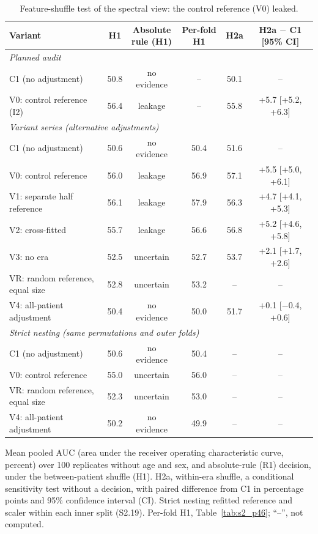 \documentclass[final,1p,times]{elsarticle}
\newcommand{\tabref}[1]{Table~\ref{#1}}
\begin{document}
\begin{table}[!htb]
\caption{Feature-shuffle test of the spectral view: the control reference (V0) leaked.}\label{tab:kebocoran_badan}
\centering\scriptsize
\setlength{\tabcolsep}{2.5pt}
\begin{tabular}{p{}ccccc}
\toprule
Variant & H1 & \shortstack{Absolute\\rule (H1)} & Per-fold H1 & H2a & \shortstack{H2a $-$ C1\\{[95\% CI]}} \\
\midrule
\multicolumn{6}{l}{\textit{Planned audit}} \\
C1 (no adjustment) & 50.8 & no evidence & -- & 50.1 & -- \\
V0: control reference (I2) & 56.4 & leakage & -- & 55.8 & +5.7 [+5.2, +6.3] \\
\midrule
\multicolumn{6}{l}{\textit{Variant series (alternative adjustments)}} \\
C1 (no adjustment) & 50.6 & no evidence & 50.4 & 51.6 & -- \\
V0: control reference & 56.0 & leakage & 56.9 & 57.1 & +5.5 [+5.0, +6.1] \\
V1: separate half reference & 56.1 & leakage & 57.9 & 56.3 & +4.7 [+4.1, +5.3] \\
V2: cross-fitted & 55.7 & leakage & 56.6 & 56.8 & +5.2 [+4.6, +5.8] \\
V3: no era & 52.5 & uncertain & 52.7 & 53.7 & +2.1 [+1.7, +2.6] \\
VR: random reference, equal size & 52.8 & uncertain & 53.2 & -- & -- \\
V4: all-patient adjustment & 50.4 & no evidence & 50.0 & 51.7 & +0.1 [$-$0.4, +0.6] \\
\midrule
\multicolumn{6}{l}{\textit{Strict nesting (same permutations and outer folds)}} \\
C1 (no adjustment) & 50.6 & no evidence & 50.4 & -- & -- \\
V0: control reference & 55.0 & uncertain & 56.0 & -- & -- \\
VR: random reference, equal size & 52.3 & uncertain & 53.0 & -- & -- \\
V4: all-patient adjustment & 50.2 & no evidence & 49.9 & -- & -- \\
\bottomrule
\end{tabular}

\vspace{2pt}
\begin{minipage}{\textwidth}\footnotesize
Mean pooled AUC (area under the receiver operating characteristic curve, percent) over 100 replicates without age and sex, and absolute-rule (R1) decision, under the between-patient shuffle (H1). H2a, within-era shuffle, a conditional sensitivity test without a decision, with paired difference from C1 in percentage points and 95\% confidence interval (CI). Strict nesting refitted reference and scaler within each inner split (S2.19). Per-fold H1, \tabref{tab:s2_p46}; ``--'', not computed.
\end{minipage}
\end{table}%
\end{document}
